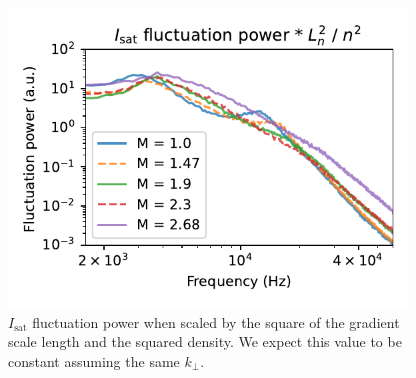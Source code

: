 \begin{figure}
	\centering
	\includegraphics[width=300pt]{figures/extra/isat_fluct_power_Ln2_n2.pdf}
	\caption[$I_\text{sat}$ scaled by $L_n^2 / n^2$]{$I_\text{sat}$ fluctuation power when scaled by the square of the gradient scale length and the squared density. We expect this value to be constant assuming the same $k_\perp$.}
	\label{fig_extra:isat_Ln2_n2}
\end{figure}



